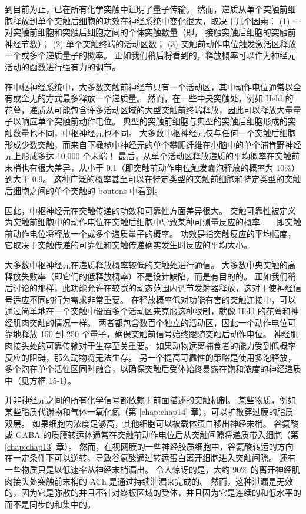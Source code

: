 到目前为止，已在所有化学突触中证明了量子传输。 
然而，递质从单个突触前细胞释放到单个突触后细胞的功效在神经系统中变化很大，取决于几个因素：
(1) 一对突触前细胞和突触后细胞之间的个体突触数量（即， 接触突触后细胞的突触前神经节数）；
 (2) 单个突触终端的活动区数； 
(3) 突触前动作电位触发激活区释放一个或多个递质量子的概率。 
正如我们稍后将看到的，释放概率可以作为神经元活动的函数进行强有力的调节。


在中枢神经系统中，大多数突触前神经节只有一个活动区，其中动作电位通常以全有或全无的方式最多释放一个递质量。 
然而，在一些中央突触处，例如 Held 的花萼，递质从可能包含许多活动区域的大型突触前终端释放，因此可以释放大量量子以响应单个突触前动作电位。 
典型的突触前细胞与典型的突触后细胞形成的突触数量也不同，中枢神经元也不同。 
大多数中枢神经元仅与任何一个突触后细胞形成少数突触，而来自下橄榄中神经元的单个攀爬纤维在小脑中的单个浦肯野神经元上形成多达 10,000 个末端！ 
最后，从单个活动区释放递质的平均概率在突触前末梢也有很大差异，从小于 0.1（即突触前动作电位触发囊泡释放的概率为 10\%）到大于 0.9。 
这种广泛的概率甚至可以在特定类型的突触前细胞和特定类型的突触后细胞之间的单个突触的 boutons 中看到。


因此，中枢神经元在突触传递的功效和可靠性方面差异很大。 
突触可靠性被定义为突触前细胞中的动作电位在突触后细胞中导致某种可测量反应的概率——即突触前动作电位将释放一个或多个递质量子的概率。 
功效是指突触反应的平均幅度，它取决于突触传递的可靠性和突触传递确实发生时反应的平均大小。


大多数中枢神经元在递质释放概率较低的突触处进行通信。 
大多数中央突触的高释放失败率（即它们的低释放概率）不是设计缺陷，而是有目的的。 
正如我们稍后讨论的那样，此功能允许在较宽的动态范围内调节发射器释放，这对于使神经信号适应不同的行为需求非常重要。 
在释放概率低对功能有害的突触连接中，可以通过简单地在一个突触中设置多个活动区来克服这种限制，就像 Held 的花萼和神经肌肉突触的情况一样。 
两者都包含数百个独立的活动区，因此一个动作电位可靠地释放 150 到 250 个量子，确保突触前信号始终跟随突触后动作电位。 
神经肌肉接头处的可靠传输对于生存至关重要。 
如果动物远离捕食者的能力受到低概率反应的阻碍，那么动物将无法生存。 
另一个提高可靠性的策略是使用多泡释放，多个泡在单个活性区同时融合，以确保突触后受体始终暴露在饱和浓度的神经递质中（见方框 15-1）。


并非神经元之间的所有化学信号都依赖于前面描述的突触机制。 
某些物质，例如某些脂质代谢物和气体一氧化氮（第 \ref{chap:chap14} 章），可以扩散穿过膜的脂质双层。 
如果细胞内浓度足够高，其他细胞可以被载体蛋白移出神经末梢。 
谷氨酸或 GABA 的质膜转运体通常在突触前动作电位后从突触间隙将递质带入细胞（第 \ref{chap:chap13} 章）。 
然而，在视网膜的一些神经胶质细胞中，谷氨酸转运的方向在一定条件下可以逆转，导致谷氨酸通过转运蛋白离开细胞进入突触间隙。 
还有一些物质只是以低速率从神经末梢漏出。 
令人惊讶的是，大约 90\% 的离开神经肌肉接头处突触前末梢的 ACh 是通过持续泄漏来完成的。 
然而，这种泄漏是无效的，因为它是弥散的并且不针对终板区域的受体，并且因为它是连续的和低水平的而不是同步的和集中的。



